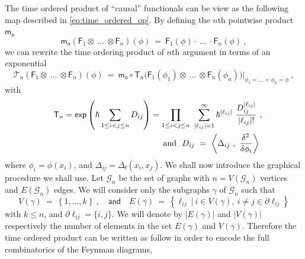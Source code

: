 \documentclass[11pt]{book}
\renewcommand{\exp}{\mathsf{exp}}
\newcommand{\abs}[1]{\left|#1\right|}
\newcommand{\sm}[1]{\left\langle#1\right\rangle}
\newcommand{\Gcal}{\mathcal{G}}
\newcommand{\Tcal}{\mathcal{T}}
\newcommand{\Fsf}{\mathsf{F}}
\newcommand{\Tsf}{\mathsf{T}}
\newcommand{\fsf}{\mathsf{f}}
\newcommand{\msf}{\mathsf{m}}
\newcommand{\nsf}{\mathsf{n}}
\theoremstyle{break}
\begin{document}
The  time ordered product of ``causal'' functionals can be view as the following map described in \eqref{eq:time_ordered_op}. By defining the $n$th pointwise product $\msf_\nsf$
%
\begin{equation*}
\msf_\nsf \left( \Fsf_1 \otimes \ ... \ \otimes \Fsf_n \right)(\phi) \ = \ \Fsf_1(\phi) \cdot \ ... \ \cdot \Fsf_n(\phi) \ ,
\end{equation*}
%
we can rewrite the time ordering product of $n$th argument in terms of an exponential
%
\begin{equation*}
\Tcal_n (\Fsf_1 \otimes \ ... \ \otimes \Fsf_n)(\phi) \ = \ \msf_\nsf \circ \Tsf_n \bigg( \Fsf_1(\phi_1) \otimes \ ... \ \otimes \Fsf_n(\phi_n) \bigg) \bigg|_{\phi_1 = ... = \phi_n = \phi} \ ,
\end{equation*}
%
with 
%
\begin{eqnarray*}
&&\Tsf_n = \exp\left(\hbar \sum_{1 \leq i < j \leq n} D_{ij}\right) =
\prod_{1 \leq i < j \leq n} \ \sum_{\abs{\ell_{ij}}=1}^\infty \hbar^{\abs{\ell_{ij}}} \ \frac{D_{ij}^{\abs{\ell_{ij}}}}{\abs{\ell_{ij}} !} \ , \\
&& \mbox{ and } \ D_{ij} \ = \ \sm{\Delta_{ij} \ , \ \frac{\delta^2 \hfil}{\delta \phi_i} } \ 
\end{eqnarray*}
%
where $\phi_i = \phi(x_i)$, and $\Delta_{ij}=\Delta_\fsf(x_i,x_j)$. We shall now introduce the graphical procedure we shall use. Let $\Gcal_n$ be the set of graphs with $n=V(\Gcal_n)$ vertices and $E(\Gcal_n)$ edges. We will consider only the subgraphs $\gamma$ of $\Gcal_n$ such that
%
\begin{equation*}
V(\gamma) \ = \ \left\{ 1, ... , k \right\} \ , \quad \mathsf{and} \quad E(\gamma) \ = \ \left\{ \ell_{ij} \ | \  i \in V(\gamma) , \ i\neq j \in \partial \ell_{ij} \right\}
\end{equation*}
%
with $k\leq n$, and $\partial \ell_{ij} = \{i,j\}$. We will denote by $\abs{E(\gamma)}$ and $\abs{V(\gamma)}$ respectively the number of elements in the set $E(\gamma)$ and $V(\gamma)$. Therefore the time ordered product can be written as follow in order to encode the full combinatorics of the Feynman diagrams,
%
\end{document}
